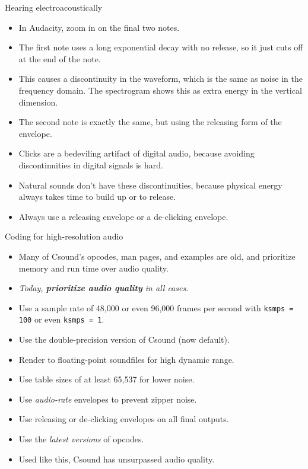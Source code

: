 \documentclass{beamer}
\begin{document}
\begin{frame}{Hearing electroacoustically}
\begin{itemize}
\item In Audacity, zoom in on the final two notes.
\item The first note uses a long exponential decay with no release, so it just cuts off at the end of the note.
\item This causes a discontinuity in the waveform, which is the same as noise in the frequency domain. The spectrogram shows this as extra energy in the vertical dimension.
\item The second note is exactly the same, but using the releasing form of the envelope.
\item Clicks are a bedeviling artifact of digital audio, because avoiding discontinuities in digital signals is hard.
\item Natural sounds don't have these discontinuities, because physical energy always takes time to build up or to release.
\item Always use a releasing envelope or a de-clicking envelope.
\end{itemize}
\end{frame}

\begin{frame}{Coding for high-resolution audio}
\begin{itemize}
\item Many of Csound's opcodes, man pages, and examples are old, and
prioritize memory and run time over audio quality.
\item \textit{Today, \textbf{prioritize audio quality} in all cases}.
\item Use a sample rate of 48,000 or even 96,000 frames per second with
\texttt{ksmps = 100} or even \texttt{ksmps = 1}.
\item Use the double-precision version of Csound (now default).
\item Render to floating-point soundfiles for high dynamic range.
\item Use table sizes of at least 65,537 for lower noise.
\item Use \textit{audio-rate} envelopes to prevent zipper noise.
\item Use releasing or de-clicking envelopes on all final outputs.
\item Use the \textit{latest versions} of opcodes.
\item Used like this, Csound has unsurpassed audio quality.
\end{itemize}
\end{frame}
\end{document}
